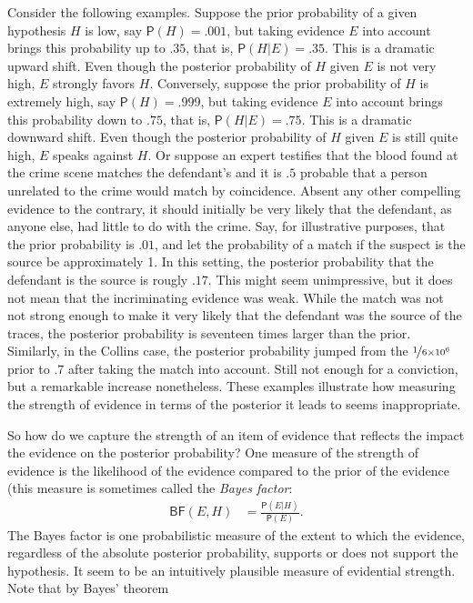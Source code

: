 \documentclass[
  10pt,
  dvipsnames,enabledeprecatedfontcommands]{scrartcl}
\newcommand{\pr}[1]{\mathsf{P}(#1)}
\begin{document}
Consider the following examples. Suppose the prior probability of a
given hypothesis \(H\) is low, say \(\pr{H}=.001\), but taking evidence
\(E\) into account brings this probability up to \(.35\), that is,
\(\pr{H \vert E}=.35\). This is a dramatic upward shift. Even though the
posterior probability of \(H\) given \(E\) is not very high, \(E\)
strongly favors \(H\). Conversely, suppose the prior probability of
\(H\) is extremely high, say \(\pr{H}=.999\), but taking evidence \(E\)
into account brings this probability down to \(.75\), that is,
\(\pr{H \vert E}=.75\). This is a dramatic downward shift. Even though
the posterior probability of \(H\) given \(E\) is still quite high,
\(E\) speaks against \(H\). Or suppose an expert testifies that the
blood found at the crime scene matches the defendant's and it is \(.5\)
probable that a person unrelated to the crime would match by
coincidence. Absent any other compelling evidence to the contrary, it
should initially be very likely that the defendant, as anyone else, had
little to do with the crime. Say, for illustrative purposes, that the
prior probability is \(.01\), and let the probability of a match if the
suspect is the source be approximately 1. In this setting, the posterior
probability that the defendant is the source is rougly \(.17\). This
might seem unimpressive, but it does not mean that the incriminating
evidence was weak. While the match was not not strong enough to make it
very likely that the defendant was the source of the traces, the
posterior probability is seventeen times larger than the prior.
Similarly, in the Collins case, the posterior probability jumped from
the \(\nicefrac{1}{6 \times 10^6}\) prior to \(.7\) after taking the
match into account. Still not enough for a conviction, but a remarkable
increase nonetheless. These examples illustrate how measuring the
strength of evidence in terms of the posterior it leads to seems
inappropriate.

So how do we capture the strength of an item of evidence that reflects
the impact the evidence on the posterior probability? One measure of the
strength of evidence is the likelihood of the evidence compared to the
prior of the evidence (this measure is sometimes called the
\emph{Bayes factor}: \begin{align}\label{eq:BF}
\tag{BF}
\mathsf{BF}(E,H) & = \frac{\pr{E \vert H}}{\pr{E}}.
\end{align} \noindent The Bayes factor is one probabilistic measure of
the extent to which the evidence, regardless of the absolute posterior
probability, supports or does not support the hypothesis. It seem to be
an intuitively plausible measure of evidential strength. Note that by
Bayes' theorem
\end{document}
